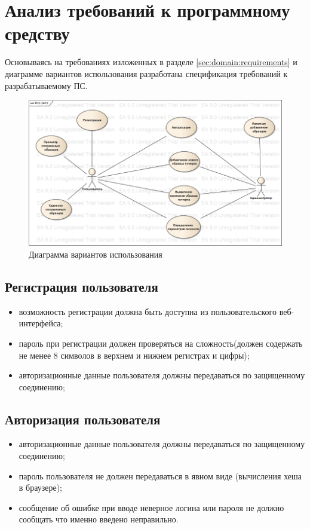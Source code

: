 \section{Анализ требований к программному средству}
\label{sec:freq}

Основываясь на требованиях изложенных в разделе \ref{sec:domain:requirements} и диаграмме вариантов использования разработана спецификация требований к разрабатываемому ПС.

\begin{figure}[ht]
\centering
    \includegraphics[scale=0.53]{figures/use_case.png}  
    \caption{Диаграмма вариантов использования}
  \label{fig:freg:usecase}
\end{figure}

\subsection{Регистрация пользователя}
\label{sec:freq:reg}
\begin{itemize}
	\item возможность регистрации должна быть доступна из пользовательского веб-интерфейса;
	\item пароль при регистрации должен проверяться на сложность(должен содержать не менее 8 символов в верхнем и нижнем регистрах и цифры);
	\item авторизационные данные пользователя должны передаваться по защищенному соединению;
\end{itemize}

\subsection{Авторизация пользователя}
\label{sec:freq:auth}
\begin{itemize}
	\item авторизационные данные пользователя должны передаваться по защищенному соединению;
	\item пароль пользователя не должен передаваться в явном виде (вычисления хеша в браузере);
 	\item сообщение об ошибке при вводе неверное логина или пароля не должно сообщать что именно введено неправильно.
\end{itemize}

